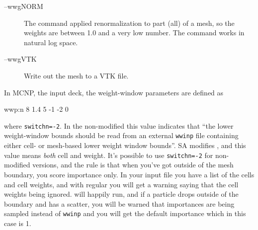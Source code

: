 \begin{description}
\begin{description}
\item[--wwgNORM] The command applied renormalization to part (all) of a mesh, so the weights
  are between 1.0 and a very low number. The command works in natural log space.

\item[--wwgVTK] Write out the mesh to a VTK file.

\end{description}

In MCNP, the input deck, the weight-window parameters are defined as
\begin{deck}
 wwp:n 8 1.4 5 -1 -2 0
\end{deck}
where {\tt switchn=-2}.  In the non-modified \mcnp this value
indicates that ``the lower weight-window bounds should be read from an
external {\tt wwinp} file containing either cell- or mesh-based lower
weight window bounds''.  SA modifies \mcnp, and this value means {\em
  both} cell and weight.  It's possible to use {\tt switchn=-2} for
non-modified \mcnp versions, and the rule is that when you've got
outside of the mesh boundary, you score importance only. In your input
file you have a list of the cells and cell weights, and with regular
\mcnp you will get a warning saying that the cell weights being
ignored.  \mcnp will happily run, and if a particle drops outside of
the boundary and has a scatter, you will be warned that importances
are being sampled instead of {\tt wwinp} 
and you will get the default importance which in this case is 1.


\end{description}
